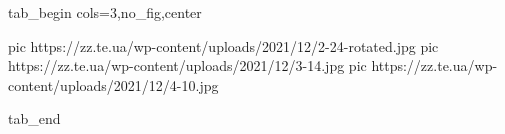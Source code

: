  
 
 
 
 


\ifcmt
  tab_begin cols=3,no_fig,center

     pic https://zz.te.ua/wp-content/uploads/2021/12/2-24-rotated.jpg
		 pic https://zz.te.ua/wp-content/uploads/2021/12/3-14.jpg
		 pic https://zz.te.ua/wp-content/uploads/2021/12/4-10.jpg

  tab_end
\fi
